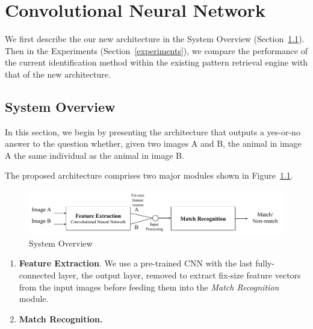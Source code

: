 \graphicspath{{./images/chap7/}}
\chapter{Convolutional Neural Network}

We first describe the our new architecture in the System Overview
(Section~\ref{system}). Then in the Experiments (Section~\ref{experiments}), we
compare the performance of the current identification method within the
existing pattern retrieval engine with that of the new architecture.

\section{System Overview}\label{system}

In this section, we begin by presenting the architecture that outputs a
yes-or-no answer to the question whether, given two images A and B, the animal
in image A the same individual as the animal in image B.

The proposed architecture comprises two major modules shown in
Figure~\ref{fig:cnn_overview}.

\begin{figure}[ht]
  \centering
  \includegraphics[width=\textwidth]{system/overview}
  \caption{System Overview}
  \label{fig:cnn_overview} %
\end{figure}

\begin{enumerate}
  \item \textbf{Feature Extraction}. We use a pre-trained CNN with the last
  fully-connected layer, the output layer, removed to extract fix-size feature
  vectors from the input images before feeding them into the \emph{Match Recognition} module.
  \item \textbf{Match Recognition.}
\end{enumerate}

